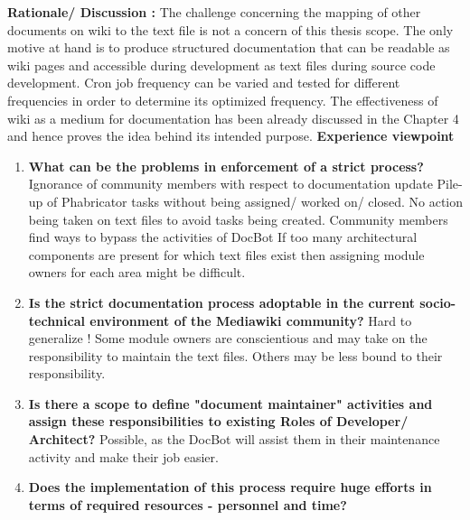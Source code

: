 \textbf{Rationale/ Discussion : } The challenge concerning the mapping of other documents on wiki to the text file is not a concern of this thesis scope. The only motive at hand is to produce structured documentation that can be readable as wiki pages and accessible during development as text files during source code development.
\newline \newline
Cron job frequency can be varied and tested for different frequencies in order to determine its optimized frequency.
\newline \newline
The effectiveness of wiki as a medium for documentation has been already discussed in the Chapter 4 and hence proves the idea behind its intended purpose. 
\textbf{Experience viewpoint}
\begin{enumerate}
\item \textbf{What can be the problems in enforcement of a strict process?}
\newline Ignorance of community members with respect to documentation update
\newline Pile-up of Phabricator tasks without being assigned/ worked on/ closed.
\newline No action being taken on text files to avoid tasks being created.
\newline Community members find ways to bypass the activities of DocBot
\newline If too many architectural components are present for which text files exist then assigning module owners for each area might be difficult.
\item \textbf{Is the strict documentation process adoptable in the current socio-technical environment of the Mediawiki community?}
\newline Hard to generalize !
\newline Some module owners are conscientious and may take on the responsibility to maintain the text files.
\newline Others may be less bound to their responsibility.
\item \textbf{Is there a scope to define "document maintainer" activities and assign these responsibilities to existing Roles of Developer/ Architect? }
\newline Possible, as the DocBot will assist them in their maintenance activity and make their job easier.
\item \textbf{Does the implementation of this process require huge efforts in terms of required resources - personnel and time? }

\end{enumerate}
